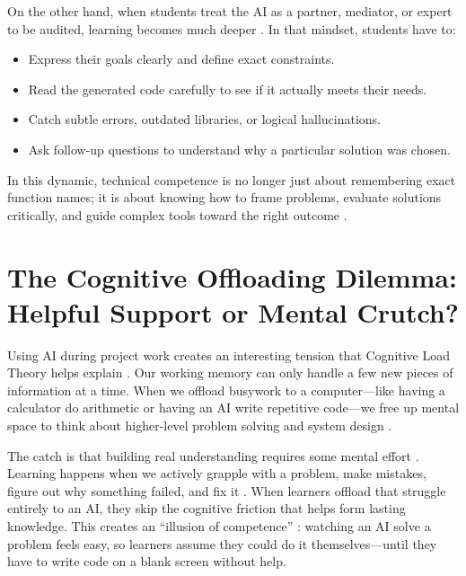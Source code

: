 \documentclass[11pt]{article}
\begin{document}
On the other hand, when students treat the AI as a partner, mediator, or expert to be audited, learning becomes much deeper \citep{song2026heutagogy}. In that mindset, students have to:
\begin{itemize}
\item Express their goals clearly and define exact constraints.
\item Read the generated code carefully to see if it actually meets their needs.
\item Catch subtle errors, outdated libraries, or logical hallucinations.
\item Ask follow-up questions to understand why a particular solution was chosen.
\end{itemize}
In this dynamic, technical competence is no longer just about remembering exact function names; it is about knowing how to frame problems, evaluate solutions critically, and guide complex tools toward the right outcome \citep{agenticengineer2026}.

\section{The Cognitive Offloading Dilemma: Helpful Support or Mental Crutch?}

Using AI during project work creates an interesting tension that Cognitive Load Theory helps explain \citep{sweller1988}. Our working memory can only handle a few new pieces of information at a time. When we offload busywork to a computer---like having a calculator do arithmetic or having an AI write repetitive code---we free up mental space to think about higher-level problem solving and system design \citep{sweller1988}.

The catch is that building real understanding requires some mental effort \citep{song2026heutagogy}. Learning happens when we actively grapple with a problem, make mistakes, figure out why something failed, and fix it \citep{ericsson1993}. When learners offload that struggle entirely to an AI, they skip the cognitive friction that helps form lasting knowledge. This creates an ``illusion of competence'' \citep{song2026heutagogy}: watching an AI solve a problem feels easy, so learners assume they could do it themselves---until they have to write code on a blank screen without help.
\end{document}
